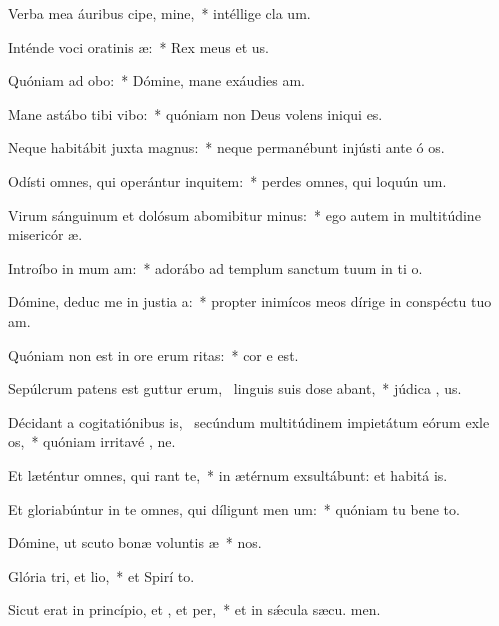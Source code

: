 \item Verba mea áuribus cipe, mine,~* intéllige cla um.
\item Inténde voci oratinis æ:~* Rex meus et  us.
\item Quóniam ad  obo:~* Dómine, mane exáudies  am.
\item Mane astábo tibi  vibo:~* quóniam non Deus volens iniqui  es.
\item Neque habitábit juxta  magnus:~* neque permanébunt injústi ante ó os.
\item Odísti omnes, qui operántur inquitem:~* perdes omnes, qui loquún um.
\item Virum sánguinum et dolósum abomibitur minus:~* ego autem in multitúdine misericór æ.
\item Introíbo in mum am:~* adorábo ad templum sanctum tuum in ti o.
\item Dómine, deduc me in justia a:~* propter inimícos meos dírige in conspéctu tuo  am.
\item Quóniam non est in ore erum ritas:~* cor e  est.
\item Sepúlcrum patens est guttur erum,~\pscross{} linguis suis dose abant,~* júdica , us.
\item Décidant a cogitatiónibus is,~\pscross{} secúndum multitúdinem impietátum eórum exle os,~* quóniam irritavé , ne.
\item Et læténtur omnes, qui rant  te,~* in ætérnum exsultábunt: et habitá  is.
\item Et gloriabúntur in te omnes, qui díligunt men um:~* quóniam tu bene to.
\item Dómine, ut scuto bonæ voluntis æ~*  nos.
\item Glória tri, et lio,~* et Spirí to.
\item Sicut erat in princípio, et , et per,~* et in sǽcula sæcu. men.
